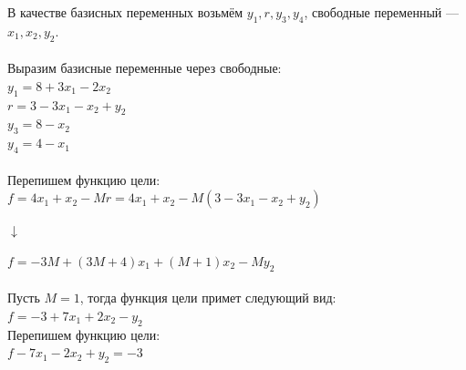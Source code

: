 \documentclass[14pt,a4paper,fleqn]{extarticle}
\begin{document}
В качестве базисных переменных возьмём $y_1, r, y_3, y_4$, свободные переменный --- $x_1, x_2, y_2$.\\\\
Выразим базисные переменные через свободные:\\
$y_1 = 8 + 3x_1 - 2x_2 $\\
$r = 3 - 3x_1 - x_2 + y_2$\\
$y_3 = 8 - x_2$\\
$y_4 = 4 - x_1$\\\\
Перепишем функцию цели:\\
$f = 4x_1 + x_2 - Mr = 4x_1 + x_2 - M(3 - 3x_1 - x_2 + y_2)$
\begin{center}$\downarrow$\end{center}
$f = -3M + (3M + 4)x_1 + (M + 1)x_2 - My_2$\\\\
Пусть $M = 1$, тогда функция цели примет следующий вид:\\
$f = -3 + 7x_1 + 2x_2 - y_2$\\

Перепишем функцию цели:\\
$f - 7x_1 - 2x_2 + y_2 = -3$
\newpage
\end{document}
